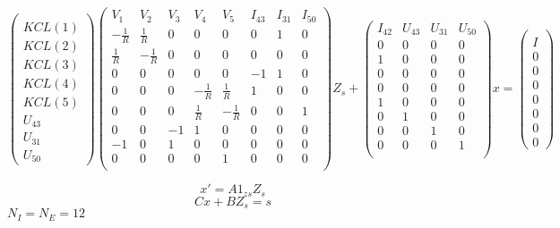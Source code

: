 \[\left(\begin{array}{c}
\\KCL(1)\\KCL(2)\\KCL(3)\\KCL(4)\\KCL(5)\\U_{43}\\U_{31}\\U_{50}
\end{array}\right)
\left(\begin{array}{cccccccc}
  V_{1}&V_{2}&V_{3}&V_{4}&V_{5}&I_{43}&I_{31}&I_{50}\\
  \hline
  -\frac{1}{R}&\frac{1}{R}&0&0&0&0&1&0\\
  \frac{1}{R}&-\frac{1}{R}&0&0&0&0&0&0\\
  0&0&0&0&0&-1&1&0\\
  0&0&0&-\frac{1}{R}&\frac{1}{R}&1&0&0\\
  0&0&0&\frac{1}{R}&-\frac{1}{R}&0&0&1\\
  0&0&-1&1&0&0&0&0\\
  -1&0&1&0&0&0&0&0\\
  0&0&0&0&1&0&0&0\\
\end{array}\right)Z_{s}+
\left(\begin{array}{cccc}
  I_{42}&U_{43}&U_{31}&U_{50}\\
  \hline
  0&0&0&0\\
  1&0&0&0\\
  0&0&0&0\\
  0&0&0&0\\
  1&0&0&0\\
  0&1&0&0\\
  0&0&1&0\\
  0&0&0&1\\
\end{array}\right)x=
\left(\begin{array}{c}
  \\ I\\  0\\  0\\  0\\  0\\  0\\  0\\  0
  \end{array}\right)
\]

\[x'=A1_{zs}Z_{s}\]
\[Cx+BZ_{s}=s\]
$N_{I}=N_{E}=12$
